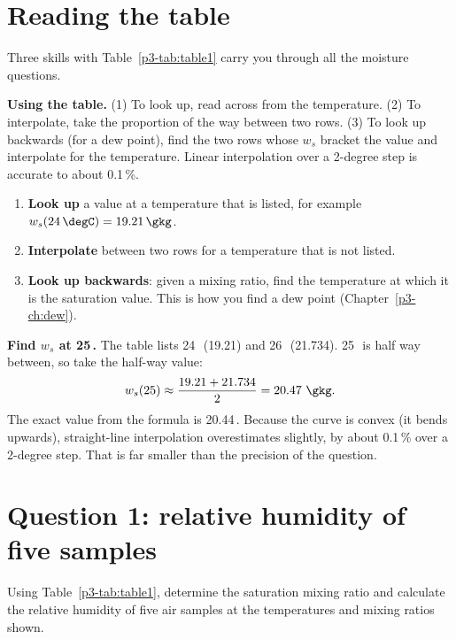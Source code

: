 \section{Reading the table}

Three skills with Table~\ref{p3-tab:table1} carry you through all the moisture questions.



\textbf{Using the table.} (1) To look up, read across from the temperature. (2) To interpolate, take the proportion of the way between two rows. (3) To look up backwards (for a dew point), find the two rows whose $w_s$ bracket the value and interpolate for the temperature. Linear interpolation over a 2-degree step is accurate to about 0.1\,\%.

\begin{enumerate}[label=\textbf{Skill \arabic*.},leftmargin=*,itemsep=4pt]
\item \textbf{Look up} a value at a temperature that is listed, for example $w_s(24\,\degC)=19.21\,\gkg$.
\item \textbf{Interpolate} between two rows for a temperature that is not listed.
\item \textbf{Look up backwards}: given a mixing ratio, find the temperature at which it is the saturation value. This is how you find a dew point (Chapter~\ref{p3-ch:dew}).
\end{enumerate}

\begin{workedbox}
\textbf{Find $w_s$ at 25\,\degC.} The table lists 24\,\degC\ (19.21) and 26\,\degC\ (21.734). 25\,\degC\ is half way between, so take the half-way value:
\[
w_s(25)\approx\frac{19.21+21.734}{2}=20.47\ \gkg.
\]
The exact value from the formula is 20.44\,\gkg. Because the curve is convex (it bends upwards), straight-line interpolation overestimates slightly, by about 0.1\,\% over a 2-degree step. That is far smaller than the precision of the question.
\end{workedbox}

\section{Question 1: relative humidity of five samples}\label{p3-sec:q1}

\begin{questionbox}
Using Table~\ref{p3-tab:table1}, determine the saturation mixing ratio and calculate the relative humidity of five air samples at the temperatures and mixing ratios shown.
\end{questionbox}

